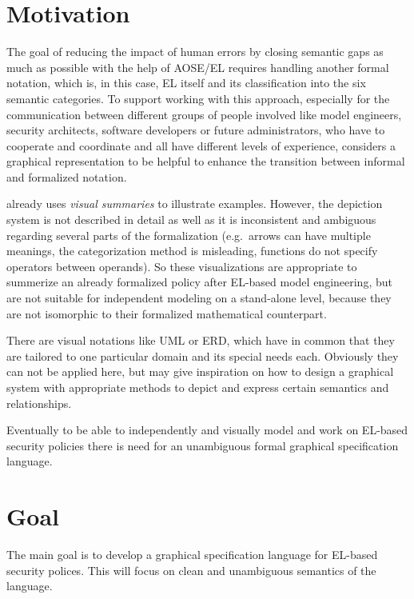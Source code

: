 \documentclass[twoside, openright, 12pt]{book}
\begin{document}
\section{Motivation} 
The goal of reducing the impact of human errors by closing semantic gaps as much as possible with the help of AOSE/EL requires handling another formal notation, which is, in this case, EL itself and its classification into the six semantic categories.
To support working with this approach, especially for the communication between different groups of people involved like model engineers, security architects, software developers or future administrators, who have to cooperate and coordinate and all have different levels of experience, \citet*{Amthor18} considers a graphical representation to be helpful to enhance the transition between informal and formalized notation.

\citet*{Amthor18} already uses \textit{visual summaries} to illustrate examples.
However, the depiction system is not described in detail as well as it is inconsistent and ambiguous regarding several parts of the formalization (e.g.\ arrows can have multiple meanings, the categorization method is misleading, functions do not specify operators between operands).
So these visualizations are appropriate to summerize an already formalized policy after EL-based model engineering, but are not suitable for independent modeling on a stand-alone level, because they are not isomorphic to their formalized mathematical counterpart.


There are visual notations like UML or ERD, which have in common that they are tailored to one particular domain and its special needs each.
Obviously they can not be applied here, but may give inspiration on how to design a graphical system with appropriate methods to depict and express certain semantics and relationships.

Eventually to be able to independently and visually model and work on EL-based security policies there is need for an unambiguous formal graphical specification language.



\section{Goal} 
The main goal is to develop a graphical specification language for EL-based security polices.
This will focus on clean and unambiguous semantics of the language.
\end{document}

